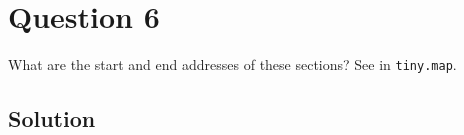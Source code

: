 \section*{Question 6}

What are the start and end addresses of these sections?
See in \texttt{tiny.map}.

\subsection*{Solution}
